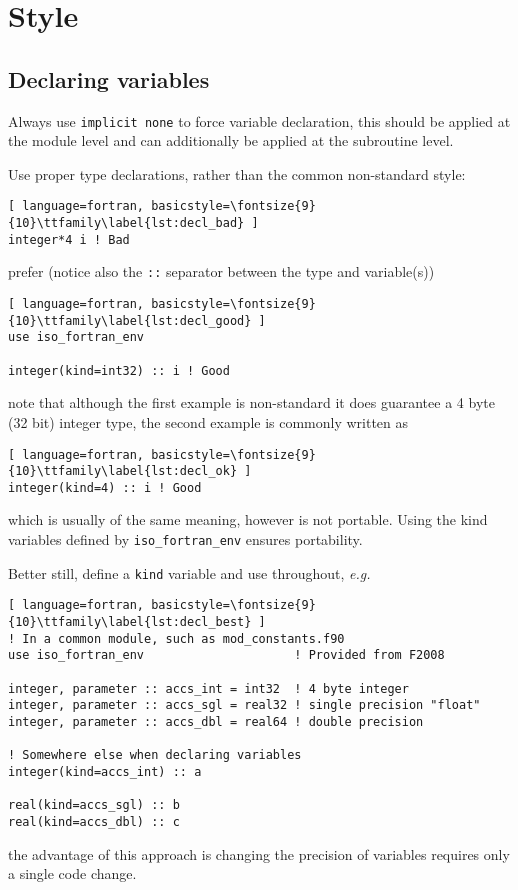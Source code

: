 \documentclass[11pt]{article}
\begin{document}
\section{Style}

\subsection{Declaring variables}
Always use \texttt{implicit none} to force variable declaration, this should be applied at the
module level and can additionally be applied at the subroutine level.

Use proper type declarations, rather than the common non-standard style:
\begin{lstlisting}[ language=fortran, basicstyle=\fontsize{9}{10}\ttfamily\label{lst:decl_bad} ]
integer*4 i ! Bad
\end{lstlisting}
prefer (notice also the \texttt{::} separator between the type and variable(s))
\begin{lstlisting}[ language=fortran, basicstyle=\fontsize{9}{10}\ttfamily\label{lst:decl_good} ]
use iso_fortran_env

integer(kind=int32) :: i ! Good
\end{lstlisting}
note that although the first example is non-standard it does guarantee a 4 byte (32 bit) integer
type, the second example is commonly written as
\begin{lstlisting}[ language=fortran, basicstyle=\fontsize{9}{10}\ttfamily\label{lst:decl_ok} ]
integer(kind=4) :: i ! Good
\end{lstlisting}
which is usually of the same meaning, however is not portable. Using the kind variables defined by
\texttt{iso\_fortran\_env} ensures portability.

Better still, define a \texttt{kind} variable and use throughout, \textit{e.g.}
\begin{lstlisting}[ language=fortran, basicstyle=\fontsize{9}{10}\ttfamily\label{lst:decl_best} ]
! In a common module, such as mod_constants.f90
use iso_fortran_env                     ! Provided from F2008

integer, parameter :: accs_int = int32  ! 4 byte integer
integer, parameter :: accs_sgl = real32 ! single precision "float"
integer, parameter :: accs_dbl = real64 ! double precision

! Somewhere else when declaring variables
integer(kind=accs_int) :: a

real(kind=accs_sgl) :: b
real(kind=accs_dbl) :: c
\end{lstlisting}
the advantage of this approach is changing the precision of variables requires only a single code
change.
\end{document}

